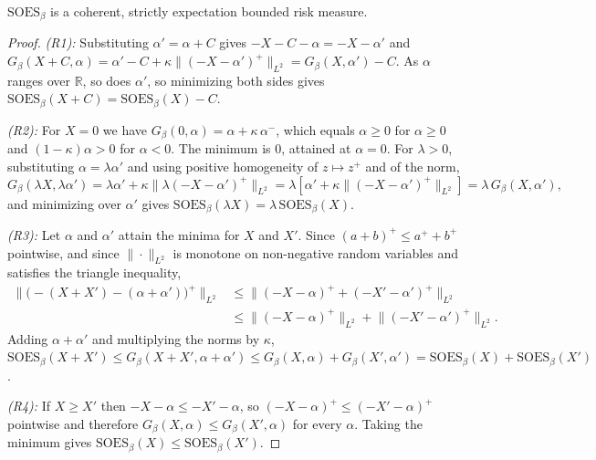 \begin{proposition}\label{prop:soes-coherent}
$\mathrm{SOES}_\beta$ is a coherent, strictly expectation bounded risk measure.
\end{proposition}

\begin{proof}
\emph{(R1):} Substituting $\alpha' = \alpha + C$ gives $-X - C - \alpha = -X - \alpha'$ and
$G_\beta(X + C, \alpha) = \alpha' - C + \kappa \|(-X-\alpha')^{+}\|_{L^2} = G_\beta(X, \alpha') - C$. As $\alpha$ ranges over
$\mathbb{R}$, so does $\alpha'$, so minimizing both sides gives
$\mathrm{SOES}_\beta(X + C) = \mathrm{SOES}_\beta(X) - C$.

\emph{(R2):} For $X = 0$ we have $G_\beta(0, \alpha) = \alpha + \kappa\, \alpha^{-}$, which equals $\alpha \geq 0$ for
$\alpha \geq 0$ and $(1-\kappa)\alpha > 0$ for $\alpha < 0$. The minimum is $0$, attained at $\alpha = 0$. For
$\lambda > 0$, substituting $\alpha = \lambda \alpha'$ and using positive homogeneity of $z \mapsto z^{+}$
and of the norm,
\begin{equation*}
G_\beta(\lambda X, \lambda \alpha')
= \lambda \alpha' + \kappa \big\| \lambda (-X - \alpha')^{+} \big\|_{L^2}
= \lambda\left[\alpha' + \kappa \big\| (-X-\alpha')^{+} \big\|_{L^2}\right]
= \lambda\, G_\beta(X, \alpha') ,
\end{equation*}
and minimizing over $\alpha'$ gives $\mathrm{SOES}_\beta(\lambda X) = \lambda\, \mathrm{SOES}_\beta(X)$.

\emph{(R3):} Let $\alpha$ and $\alpha'$ attain the minima for $X$ and $X'$. Since
$(a + b)^{+} \leq a^{+} + b^{+}$ pointwise, and since $\|\cdot\|_{L^2}$ is monotone on non-negative random
variables and satisfies the triangle inequality,
\begin{equation*}
\begin{aligned}
\big\| \big(-(X + X') - (\alpha + \alpha')\big)^{+} \big\|_{L^2}
&\leq \big\| (-X-\alpha)^{+} + (-X'-\alpha')^{+} \big\|_{L^2} \\
&\leq \big\| (-X-\alpha)^{+} \big\|_{L^2} + \big\| (-X'-\alpha')^{+} \big\|_{L^2} .
\end{aligned}
\end{equation*}
Adding $\alpha + \alpha'$ and multiplying the norms by $\kappa$,
$\mathrm{SOES}_\beta(X + X') \leq G_\beta(X + X', \alpha + \alpha') \leq G_\beta(X, \alpha) + G_\beta(X', \alpha')
= \mathrm{SOES}_\beta(X) + \mathrm{SOES}_\beta(X')$.

\emph{(R4):} If $X \geq X'$ then $-X - \alpha \leq -X' - \alpha$, so $(-X-\alpha)^{+} \leq (-X'-\alpha)^{+}$
pointwise and therefore $G_\beta(X, \alpha) \leq G_\beta(X', \alpha)$ for every $\alpha$. Taking the minimum gives
$\mathrm{SOES}_\beta(X) \leq \mathrm{SOES}_\beta(X')$.


\end{proof}
